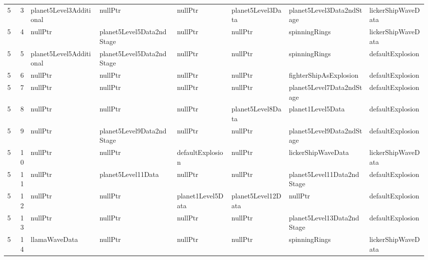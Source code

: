 \begin{tabular}{rrllllll}
      5 &       3 & planet5Level3Additional  & nullPtr                      & nullPtr                      & planet5Level3Data         & planet5Level3Data2ndStage  & lickerShipWaveData         \\
      5 &       4 & nullPtr                  & planet5Level5Data2ndStage    & nullPtr                      & nullPtr                   & spinningRings              & lickerShipWaveData         \\
      5 &       5 & planet5Level5Additional  & planet5Level5Data2ndStage    & nullPtr                      & nullPtr                   & spinningRings              & defaultExplosion           \\
      5 &       6 & nullPtr                  & nullPtr                      & nullPtr                      & nullPtr                   & fighterShipAsExplosion     & defaultExplosion           \\
      5 &       7 & nullPtr                  & nullPtr                      & nullPtr                      & nullPtr                   & planet5Level7Data2ndStage  & defaultExplosion           \\
      5 &       8 & nullPtr                  & nullPtr                      & nullPtr                      & planet5Level8Data         & planet1Level5Data          & defaultExplosion           \\
      5 &       9 & nullPtr                  & planet5Level9Data2ndStage    & nullPtr                      & nullPtr                   & planet5Level9Data2ndStage  & defaultExplosion           \\
      5 &      10 & nullPtr                  & nullPtr                      & defaultExplosion             & nullPtr                   & lickerShipWaveData         & lickerShipWaveData         \\
      5 &      11 & nullPtr                  & planet5Level11Data           & nullPtr                      & nullPtr                   & planet5Level11Data2ndStage & defaultExplosion           \\
      5 &      12 & nullPtr                  & nullPtr                      & planet1Level5Data            & planet5Level12Data        & nullPtr                    & defaultExplosion           \\
      5 &      13 & nullPtr                  & nullPtr                      & nullPtr                      & nullPtr                   & planet5Level13Data2ndStage & defaultExplosion           \\
      5 &      14 & llamaWaveData            & nullPtr                      & nullPtr                      & nullPtr                   & spinningRings              & lickerShipWaveData         \\

\end{tabular}
